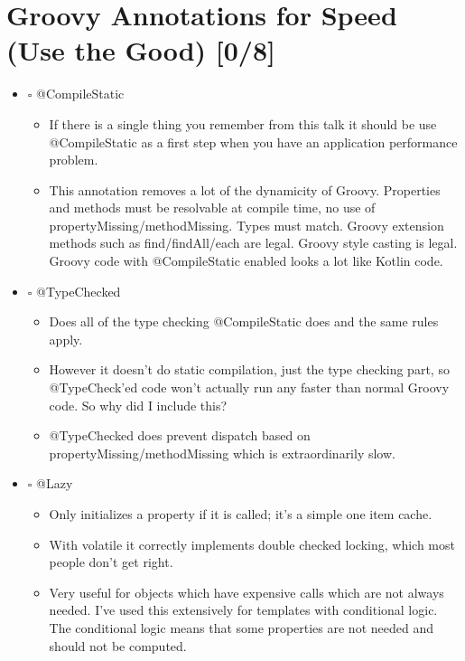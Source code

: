 \documentclass[11pt]{article}
\begin{document}
\section{Groovy Annotations for Speed (Use the Good) [0/8]}
\label{sec:orgheadline6}

\begin{itemize}
\item $\square$ @CompileStatic

\begin{itemize}
\item If there is a single thing you remember from this talk it should be use @CompileStatic as a first step when you have an application performance problem.

\item This annotation removes a lot of the dynamicity of Groovy. Properties and methods must be resolvable at compile time, no use of propertyMissing/methodMissing. Types must match. Groovy extension methods such as find/findAll/each are legal. Groovy style casting is legal. Groovy code with @CompileStatic enabled looks a lot like Kotlin code.
\end{itemize}

\item $\square$ @TypeChecked

\begin{itemize}
\item Does all of the type checking @CompileStatic does and the same rules apply.

\item However it doesn't do static compilation, just the type checking part, so @TypeCheck'ed code won't actually run any faster than normal Groovy code. So why did I include this?

\item @TypeChecked does prevent dispatch based on propertyMissing/methodMissing which is extraordinarily slow.
\end{itemize}

\item $\square$ @Lazy

\begin{itemize}
\item Only initializes a property if it is called; it's a simple one item cache.

\item With volatile it correctly implements double checked locking, which most people don't get right.

\item Very useful for objects which have expensive calls which are not always needed. I've used this extensively for templates with conditional logic. The conditional logic means that some properties are not needed and should not be computed.
\end{itemize}


\end{itemize}
\end{document}
